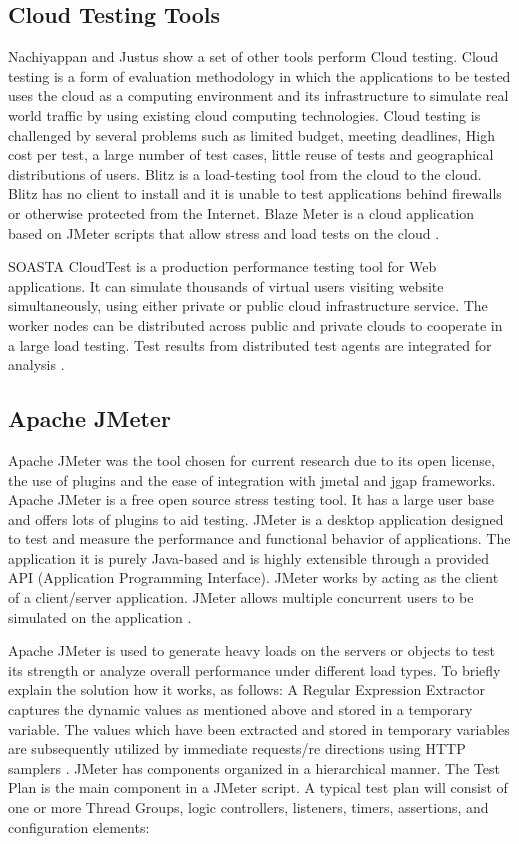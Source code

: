 \documentclass[espaco=umemeio,chapter=TITLE,twoside,openright]{abnt}
\begin{document}
\subsection{Cloud Testing Tools}

Nachiyappan and Justus show a set of other tools perform Cloud testing. Cloud testing is a form of evaluation methodology in which the applications to be tested uses the cloud as a computing environment and its infrastructure to simulate real world traffic by using existing cloud computing technologies. Cloud testing is challenged by several problems such as limited budget, meeting deadlines, High cost per test, a large number of test cases, little reuse of tests and geographical distributions of users.  Blitz is a load-testing tool from the cloud to the cloud. Blitz has no client to install and it is unable to test applications behind firewalls or otherwise protected from the Internet. Blaze Meter is a cloud application based on JMeter scripts that allow stress and load tests on the cloud \cite{Nachiyappan2015}.

SOASTA CloudTest is a production performance testing
tool for Web applications. It can simulate thousands of virtual users visiting website simultaneously, using either private or public cloud infrastructure service. The worker nodes can be distributed across public and private clouds to cooperate in a large load testing. Test results from distributed test agents are
integrated for analysis \cite{Bai2011a}.

\subsection{Apache JMeter}

Apache JMeter was the tool chosen for current research due to its open license, the use of plugins and the ease of integration with jmetal and jgap frameworks. Apache JMeter is a free open source stress testing tool.  It has a large user base and offers lots of plugins to aid testing. JMeter is a desktop application designed to test and measure the performance and functional behavior of applications. The application it is purely Java-based and is highly extensible through a provided API (Application Programming Interface). JMeter works by acting as the client of a client/server application. JMeter allows multiple concurrent users to be simulated on the application \cite{Halili2008} \cite{Erinle2013}.

Apache JMeter is used to generate heavy loads on the servers or objects to test its strength or analyze overall performance under different load types. To briefly explain the solution how it works, as follows: A Regular Expression Extractor captures the dynamic values as mentioned above and stored in a temporary variable. The values which have been extracted and stored in temporary variables are subsequently utilized by immediate requests/re directions using HTTP samplers \cite{Kiran2015}. JMeter has components organized in a hierarchical manner. The Test Plan is the main component in a JMeter script. A typical test plan will consist of one or more Thread Groups, logic controllers, listeners, timers, assertions, and configuration elements:
\end{document}
